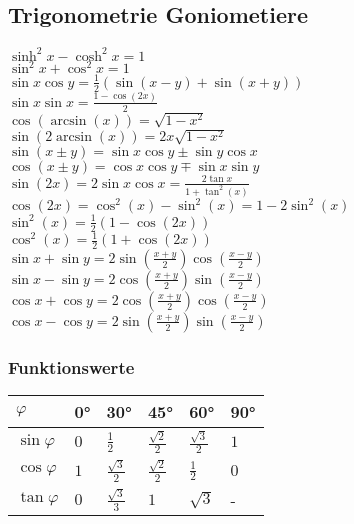     \subsection{Trigonometrie \/ Goniometiere}
        $\sinh^2x-\cosh^2x=1$ \\
        $\sin^2x+\cos^2x=1$ \\
        $\sin{x}\cos{y} = \frac{1}{2}(\sin(x - y)+\sin(x + y))$ \\
        $\sin{x}\sin{x} = \frac{1-\cos(2x)}{2}$ \\
        $\cos(\arcsin(x)) = \sqrt{1-x^2}$ \\
        $\sin(2 \arcsin(x)) = 2x\sqrt{1-x^2}$ \\
        $\sin(x\pm y) = \sin{x}\cos{y}\pm\sin{y}\cos{x}$ \\
        $\cos(x\pm y) = \cos{x}\cos{y}\mp\sin{x}\sin{y}$ \\
        $\sin(2x) = 2\sin{x}\cos{x} = \frac{2\tan{x}}{1+\tan^2(x)}$ \\
        $\cos(2x) = \cos^2(x)-\sin^2(x) = 1-2\sin^2(x)$ \\
        $\sin^2(x) = \frac{1}{2}(1-\cos(2x))$ \\
        $\cos^2(x) = \frac{1}{2}(1+\cos(2x))$ \\
        $\sin{x}+\sin{y} = 2\sin\left(\frac{x+y}{2}\right)\cos\left(\frac{x-y}{2}\right)$ \\
        $\sin{x}-\sin{y} = 2\cos\left(\frac{x+y}{2}\right)\sin\left(\frac{x-y}{2}\right)$ \\
        $\cos{x}+\cos{y} = 2\cos\left(\frac{x+y}{2}\right)\cos\left(\frac{x-y}{2}\right)$ \\
        $\cos{x}-\cos{y} = 2\sin\left(\frac{x+y}{2}\right)\sin\left(\frac{x-y}{2}\right)$
	\subsubsection{Funktionswerte}
		\begin{tabular}{l|l l l l l}
			$\varphi$ & 0° & 30° & 45° & 60° & 90° \\
			\hline
			$\sin{\varphi}$ & $0$ & $\frac{1}{2}$ & $\frac{\sqrt{2}}{2}$ & $\frac{\sqrt{3}}{2}$ & $1$ \\
			$\cos{\varphi}$ & $1$ & $\frac{\sqrt{3}}{2}$ & $\frac{\sqrt{2}}{2}$ & $\frac{1}{2}$ & $0$ \\
			$\tan{\varphi}$ & $0$ & $\frac{\sqrt{3}}{3}$ & $1$ & $\sqrt{3}$ & - \\
		\end{tabular}

